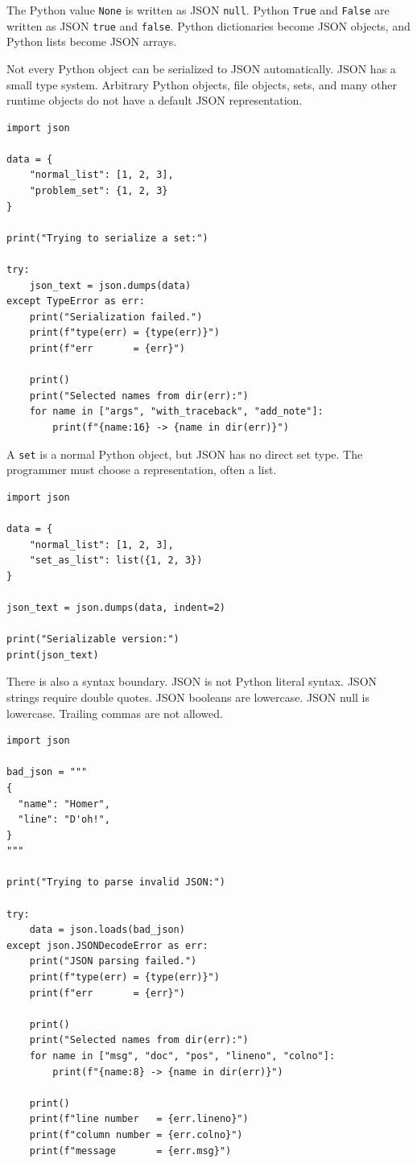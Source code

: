 The Python value \texttt{None} is written as JSON \texttt{null}. Python \texttt{True} and \texttt{False} are written as JSON \texttt{true} and \texttt{false}. Python dictionaries become JSON objects, and Python lists become JSON arrays.

Not every Python object can be serialized to JSON automatically. JSON has a small type system. Arbitrary Python objects, file objects, sets, and many other runtime objects do not have a default JSON representation.

\begin{verbatim}
import json

data = {
    "normal_list": [1, 2, 3],
    "problem_set": {1, 2, 3}
}

print("Trying to serialize a set:")

try:
    json_text = json.dumps(data)
except TypeError as err:
    print("Serialization failed.")
    print(f"type(err) = {type(err)}")
    print(f"err       = {err}")

    print()
    print("Selected names from dir(err):")
    for name in ["args", "with_traceback", "add_note"]:
        print(f"{name:16} -> {name in dir(err)}")
\end{verbatim}

A \texttt{set} is a normal Python object, but JSON has no direct set type. The programmer must choose a representation, often a list.

\begin{verbatim}
import json

data = {
    "normal_list": [1, 2, 3],
    "set_as_list": list({1, 2, 3})
}

json_text = json.dumps(data, indent=2)

print("Serializable version:")
print(json_text)
\end{verbatim}

There is also a syntax boundary. JSON is not Python literal syntax. JSON strings require double quotes. JSON booleans are lowercase. JSON null is lowercase. Trailing commas are not allowed.

\begin{verbatim}
import json

bad_json = """
{
  "name": "Homer",
  "line": "D'oh!",
}
"""

print("Trying to parse invalid JSON:")

try:
    data = json.loads(bad_json)
except json.JSONDecodeError as err:
    print("JSON parsing failed.")
    print(f"type(err) = {type(err)}")
    print(f"err       = {err}")

    print()
    print("Selected names from dir(err):")
    for name in ["msg", "doc", "pos", "lineno", "colno"]:
        print(f"{name:8} -> {name in dir(err)}")

    print()
    print(f"line number   = {err.lineno}")
    print(f"column number = {err.colno}")
    print(f"message       = {err.msg}")
\end{verbatim}

